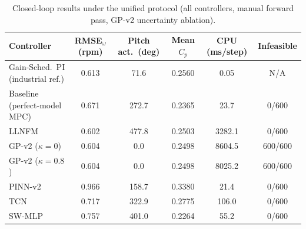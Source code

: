 \begin{table}[H]
\centering
\caption{Closed-loop results under the unified protocol (all
controllers, manual forward pass, GP-v2 uncertainty ablation).}
\label{tab:unified_protocol}
\small
\begin{tabular}{p{3cm}ccccc}
\toprule
Controller & RMSE$_\omega$ (rpm) & Pitch act.\ (deg) & Mean $C_p$ & CPU (ms/step) & Infeasible \\
\midrule
Gain-Sched.\ PI (industrial ref.) & 0.613 & 71.6 & 0.2560 & 0.05 & N/A \\
Baseline (perfect-model MPC) & 0.671 & 272.7 & 0.2365 & 23.7 & 0/600 \\
LLNFM & 0.602 & 477.8 & 0.2503 & 3282.1 & 0/600 \\
GP-v2 ($\kappa=0$) & 0.604 & 0.0 & 0.2498 & 8604.5 & 600/600 \\
GP-v2 ($\kappa=0.8$) & 0.604 & 0.0 & 0.2498 & 8025.2 & 600/600 \\
PINN-v2 & 0.966 & 158.7 & 0.3380 & 21.4 & 0/600 \\
TCN & 0.717 & 322.9 & 0.2775 & 106.0 & 0/600 \\
SW-MLP & 0.757 & 401.0 & 0.2264 & 55.2 & 0/600 \\
\bottomrule
\end{tabular}
\end{table}

